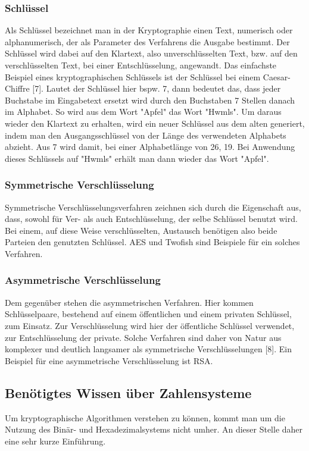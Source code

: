\documentclass[conference,10pt,a4paper,twocolumn]{IEEEtran}
\begin{document}
\subsubsection{Schlüssel}
Als Schlüssel bezeichnet man in der Kryptographie einen Text, numerisch oder alphanumerisch, der als Parameter des Verfahrens die Ausgabe bestimmt. Der Schlüssel wird dabei auf den Klartext, also unverschlüsselten Text, bzw. auf den verschlüsselten Text, bei einer Entschlüsselung, angewandt. Das einfachste Beispiel eines kryptographischen Schlüssels ist der Schlüssel bei einem Caesar-Chiffre [7]. Lautet der Schlüssel hier bspw. 7, dann bedeutet das, dass jeder Buchstabe im Eingabetext ersetzt wird durch den Buchstaben 7 Stellen danach im Alphabet. So wird aus dem Wort "Apfel" das Wort "Hwmls". Um daraus wieder den Klartext zu erhalten, wird ein neuer Schlüssel aus dem alten generiert, indem man den Ausgangsschlüssel von der Länge des verwendeten Alphabets abzieht. Aus 7 wird damit, bei einer Alphabetlänge von 26, 19. Bei Anwendung dieses Schlüssels auf "Hwmls" erhält man dann wieder das Wort "Apfel".

\bigskip
\subsubsection{Symmetrische Verschlüsselung}
Symmetrische Verschlüsselungsverfahren zeichnen sich durch die Eigenschaft aus, dass, sowohl für Ver- als auch Entschlüsselung, der selbe Schlüssel benutzt wird. Bei einem, auf diese Weise verschlüsselten, Austausch benötigen also beide Parteien den genutzten Schlüssel. AES und Twofish sind Beispiele für ein solches Verfahren.

\bigskip
\subsubsection{Asymmetrische Verschlüsselung}
Dem gegenüber stehen die asymmetrischen Verfahren. Hier kommen Schlüsselpaare, bestehend auf einem öffentlichen und einem privaten Schlüssel, zum Einsatz. Zur Verschlüsselung wird hier der öffentliche Schlüssel verwendet, zur Entschlüsselung der private. Solche Verfahren sind daher von Natur aus komplexer und deutlich langsamer als symmetrische Verschlüsselungen [8]. Ein Beispiel für eine asymmetrische Verschlüsselung ist RSA.

\subsection{Benötigtes Wissen über Zahlensysteme}
Um kryptographische Algorithmen verstehen zu können, kommt man um die Nutzung des Binär- und Hexadezimalsystems nicht umher. An dieser Stelle daher eine sehr kurze Einführung.
\end{document}
